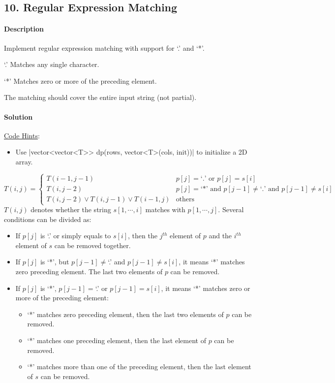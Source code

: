 \subsection{10. Regular Expression Matching}

\paragraph{Description}

Implement regular expression matching with support for `.' and `*'.

`.' Matches any single character.

`*' Matches zero or more of the preceding element.

The matching should cover the entire input string (not partial).

\paragraph{Solution}

\underline{Code Hints}:
\begin{itemize}
    \item Use |vector<vector<T>> dp(rows, vector<T>(cols, init))| to initialize a 2D array.
\end{itemize}

\begin{equation*}
T(i,j)=\begin{cases}
T(i-1,j-1) & p[j]=\text{`.' or }p[j]=s[i]\\
T(i,j-2) & p[j]=\text{`*' and }p[j-1]\neq\text{`.' and }p[j-1]\neq s[i]\\
T(i,j-2)\vee T(i,j-1)\vee T(i-1,j) & \text{others}
\end{cases}
\end{equation*}
$T(i,j)$ denotes whether the string $s[1,\cdots,i]$ matches with $p[1,\cdots,j]$. Several conditions can be divided as:
\begin{itemize}
    \item If $p[j]$ is `.' or simply equals to $s[i]$, then the $j^{th}$ element of $p$ and the $i^{th}$ element of $s$ can be removed together.
    \item If $p[j]$ is `*', but $p[j-1]\neq$`.' and $p[j-1]\neq s[i]$, it means `*' matches zero preceding element. The last two elements of $p$ can be removed.
    \item If $p[j]$ is `*', $p[j-1]=$`.' or $p[j-1]=s[i]$, it means `*' matches zero or more of the preceding element:
    \begin{itemize}
        \item `*' matches zero preceding element, then the last two elements of $p$ can be removed.
        \item `*' matches one preceding element, then the last element of $p$ can be removed.
        \item `*' matches more than one of the preceding element, then the last element of $s$ can be removed.
    \end{itemize}
\end{itemize}


